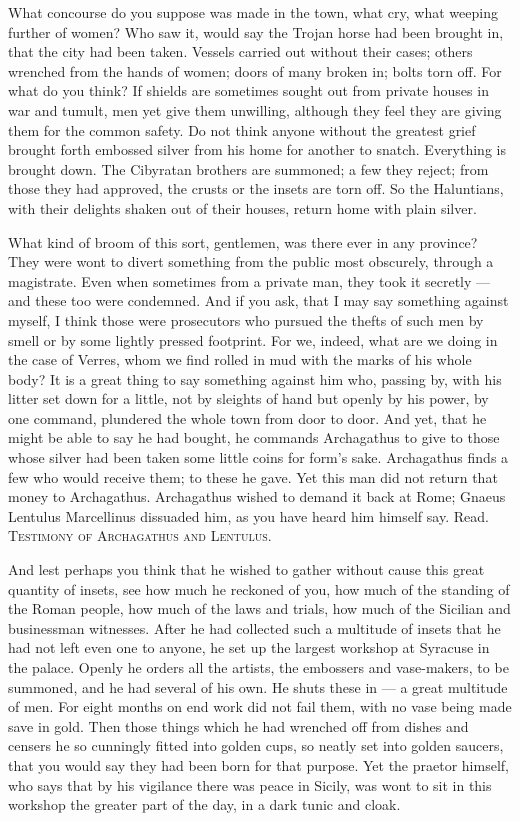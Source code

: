  What concourse do you suppose was made in the town, what cry, what weeping further of women? Who saw it, would say the Trojan horse had been brought in, that the city had been taken. Vessels carried out without their cases; others wrenched from the hands of women; doors of many broken in; bolts torn off. For what do you think? If shields are sometimes sought out from private houses in war and tumult, men yet give them unwilling, although they feel they are giving them for the common safety. Do not think anyone without the greatest grief brought forth embossed silver from his home for another to snatch. Everything is brought down. The Cibyratan brothers are summoned; a few they reject; from those they had approved, the crusts or the insets are torn off. So the Haluntians, with their delights shaken out of their houses, return home with plain silver.

 What kind of broom of this sort, gentlemen, was there ever in any province? They were wont to divert something from the public most obscurely, through a magistrate. Even when sometimes from a private man, they took it secretly --- and these too were condemned. And if you ask, that I may say something against myself, I think those were prosecutors who pursued the thefts of such men by smell or by some lightly pressed footprint. For we, indeed, what are we doing in the case of Verres, whom we find rolled in mud with the marks of his whole body? It is a great thing to say something against him who, passing by, with his litter set down for a little, not by sleights of hand but openly by his power, by one command, plundered the whole town from door to door. And yet, that he might be able to say he had bought, he commands Archagathus to give to those whose silver had been taken some little coins for form's sake. Archagathus finds a few who would receive them; to these he gave. Yet this man did not return that money to Archagathus. Archagathus wished to demand it back at Rome; Gnaeus Lentulus Marcellinus dissuaded him, as you have heard him himself say. Read. \textsc{Testimony of Archagathus and Lentulus}.

 And lest perhaps you think that he wished to gather without cause this great quantity of insets, see how much he reckoned of you, how much of the standing of the Roman people, how much of the laws and trials, how much of the Sicilian and businessman witnesses. After he had collected such a multitude of insets that he had not left even one to anyone, he set up the largest workshop at Syracuse in the palace. Openly he orders all the artists, the embossers and vase-makers, to be summoned, and he had several of his own. He shuts these in --- a great multitude of men. For eight months on end work did not fail them, with no vase being made save in gold. Then those things which he had wrenched off from dishes and censers he so cunningly fitted into golden cups, so neatly set into golden saucers, that you would say they had been born for that purpose. Yet the praetor himself, who says that by his vigilance there was peace in Sicily, was wont to sit in this workshop the greater part of the day, in a dark tunic and cloak.

